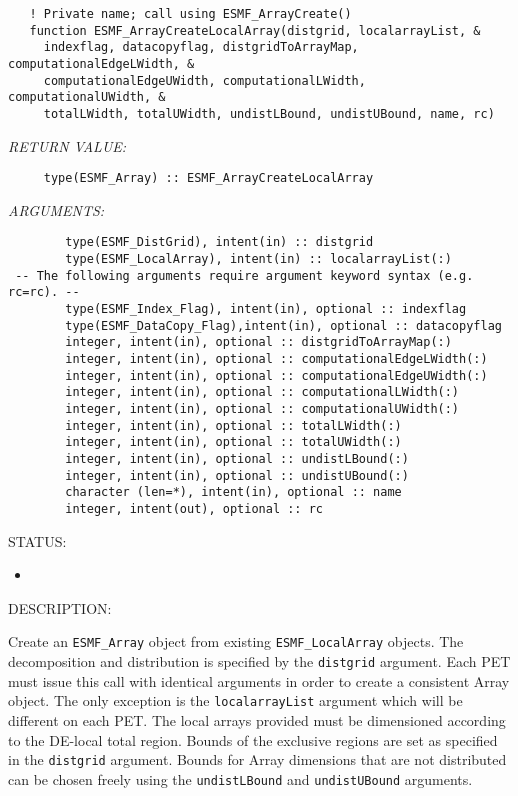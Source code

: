 \begin{verbatim}   ! Private name; call using ESMF_ArrayCreate()
   function ESMF_ArrayCreateLocalArray(distgrid, localarrayList, &
     indexflag, datacopyflag, distgridToArrayMap, computationalEdgeLWidth, &
     computationalEdgeUWidth, computationalLWidth, computationalUWidth, &
     totalLWidth, totalUWidth, undistLBound, undistUBound, name, rc)\end{verbatim}{\em RETURN VALUE:}
\begin{verbatim}     type(ESMF_Array) :: ESMF_ArrayCreateLocalArray\end{verbatim}{\em ARGUMENTS:}
\begin{verbatim}        type(ESMF_DistGrid), intent(in) :: distgrid
        type(ESMF_LocalArray), intent(in) :: localarrayList(:)
 -- The following arguments require argument keyword syntax (e.g. rc=rc). --
        type(ESMF_Index_Flag), intent(in), optional :: indexflag
        type(ESMF_DataCopy_Flag),intent(in), optional :: datacopyflag
        integer, intent(in), optional :: distgridToArrayMap(:)
        integer, intent(in), optional :: computationalEdgeLWidth(:)
        integer, intent(in), optional :: computationalEdgeUWidth(:)
        integer, intent(in), optional :: computationalLWidth(:)
        integer, intent(in), optional :: computationalUWidth(:)
        integer, intent(in), optional :: totalLWidth(:)
        integer, intent(in), optional :: totalUWidth(:)
        integer, intent(in), optional :: undistLBound(:)
        integer, intent(in), optional :: undistUBound(:)
        character (len=*), intent(in), optional :: name
        integer, intent(out), optional :: rc\end{verbatim}
{\sf STATUS:}
   \begin{itemize}
   \item{}
   \end{itemize}
  
{\sf DESCRIPTION:\\ }


   \begin{sloppypar}
   Create an {\tt ESMF\_Array} object from existing {\tt ESMF\_LocalArray}
   objects. The decomposition and distribution is
   specified by the {\tt distgrid} argument. Each PET must issue this call
   with identical arguments in order to create a consistent Array object.
   The only exception is the {\tt localarrayList} argument which will be
   different on each PET. The local arrays provided must be dimensioned
   according to the DE-local total region. Bounds of the exclusive regions
   are set as specified in the {\tt distgrid} argument. Bounds for Array
   dimensions that are not distributed can be chosen freely using the
   {\tt undistLBound} and {\tt undistUBound} arguments.
   \end{sloppypar}
  
